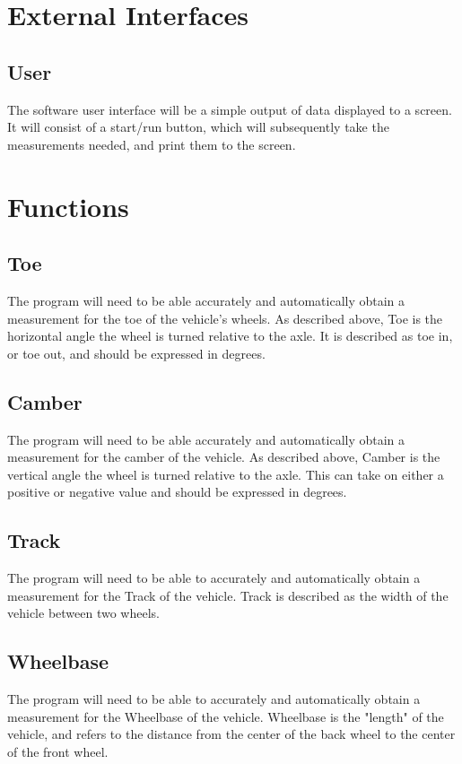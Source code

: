 \documentclass[onecolumn, draftclsnofoot,10pt, compsoc]{IEEEtran}
\begin{document}
\section{External Interfaces}

\subsection{User}
The software user interface will be a simple output of data displayed to a screen. It will consist of a start/run button, which will subsequently take the measurements needed, and print them to the screen.

\section{Functions}
\subsection{Toe}
The program will need to be able accurately and automatically obtain a measurement for the toe of the vehicle's wheels.  As described above, Toe is the horizontal angle the wheel is turned relative to the axle.  It is described as toe in, or toe out, and should be expressed in degrees.
\subsection{Camber}
The program will need to be able accurately and automatically obtain a measurement for the camber of the vehicle.  As described above, Camber is the vertical angle the wheel is turned relative to the axle.  This can take on either a positive or negative value and should be expressed in degrees.
\subsection{Track}
The program will need to be able to accurately and automatically obtain a measurement for the Track of the vehicle.  Track is described as the width of the vehicle between two wheels.
\subsection{Wheelbase}
The program will need to be able to accurately and automatically obtain a measurement for the Wheelbase of the vehicle.  Wheelbase is the "length" of the vehicle, and refers to the distance from the center of the back wheel to the center of the front wheel.
\end{document}
